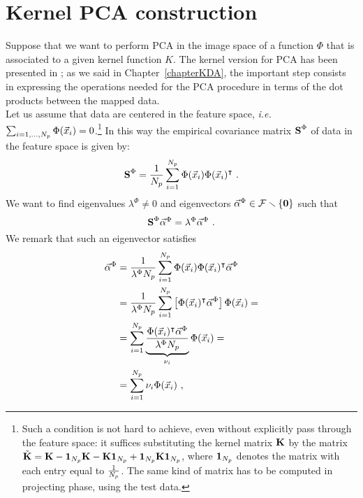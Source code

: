 \chapter{Kernel PCA construction}\label{app:KPCA}

Suppose that we want to perform PCA in the image space of a function $\Phi$ that is associated to a given kernel function $K$. The kernel version for PCA has been presented in \cite{scholkopf1998nonlinear}; as we said in Chapter~\ref{chapterKDA}, the important step consists in expressing the operations needed for the PCA procedure in terms of the dot products between the mapped data.\\

Let us assume that data are centered in the feature space, {\em i.e.} $\sum_{i=1,\dots,N_p}\Phi(\vec{x}_{i})=0$.\footnote{Such a condition is not hard to achieve, even without explicitly pass through the feature space: it suffices substituting the kernel matrix $\textbf{K}$ by the matrix $\tilde{\textbf{K}} = \textbf{K} - \boldsymbol{1}_{N_p}\textbf{K} - \textbf{K}\boldsymbol{1}_{N_p} + \boldsymbol{1}_{N_p}\textbf{K}\boldsymbol{1}_{N_p}$, where $\boldsymbol{1}_{N_p}$ denotes the matrix with each entry equal to $\frac{1}{N_p}$. The same kind of matrix has to be computed in projecting phase, using the test data.} In this way the empirical covariance matrix $\textbf{S}^\Phi$ of data in the feature space is given by:
\begin{equation}
\textbf{S}^\Phi = \frac{1}{N_p} \sum_{i=1}^{N_p}\Phi(\vec{x}_{i})\Phi(\vec{x}_{i})^\intercal \mbox{ .}
\end{equation} 
We want to find eigenvalues $\lambda^\Phi \neq 0$ and eigenvectors $\vec{\alpha}^\Phi\in \mathcal{F}\smallsetminus \{\boldsymbol{0}\}$ such that
\begin{equation}\label{eq:eigProblem}
\textbf{S}^\Phi\vec{\alpha}^\Phi = \lambda^\Phi \vec{\alpha}^\Phi \mbox{ .}
\end{equation}
We remark that such an eigenvector satisfies
\begin{align}
\vec{\alpha}^\Phi &= \frac{1}{\lambda^\Phi N_p}\sum_{i=1}^{N_p} \Phi(\vec{x}_{i})\Phi(\vec{x}_{i})^\intercal \vec{\alpha}^\Phi\\
\label{eq:passaggio}
&=  \frac{1}{\lambda^\Phi N_p}\sum_{i=1}^{N_p} \left[\Phi(\vec{x}_{i})^\intercal \vec{\alpha}^\Phi\right] \Phi(\vec{x}_{i}) =  \\
&= \sum_{i=1}^{N_p}\underbrace{\frac{\Phi(\vec{x}_{i})^\intercal \vec{\alpha}^\Phi}{\lambda^\Phi N_p}}_{\nu_i}\Phi(\vec{x}_{i}) = \\
\label{eq:linearComb}
&= \sum_{i=1}^{N_p}\nu_i \Phi(\vec{x}_{i})\mbox{ ,}
\end{align}
